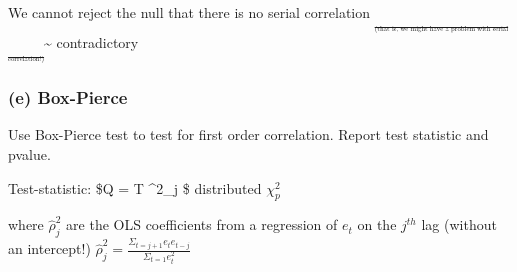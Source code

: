 \documentclass[11pt,]{article}
\begin{document}
We cannot reject the null that there is no serial correlation
\textsubscript{\textsubscript{\textsubscript{\textsubscript{\sout{(that
is, we might have a problem with serial
correlation!)}}}}}\textasciitilde{} contradictory

\subsubsection{(e) Box-Pierce}\label{e-box-pierce}

Use Box-Pierce test to test for first order correlation. Report test
statistic and pvalue.

Test-statistic: \$Q = T \Sigma\hat\rho\^{}2\_j \$ distributed
\(\chi^2_p\)

where \(\hat\rho^2_j\) are the OLS coefficients from a regression of
\(e_t\) on the \(j^{th}\) lag (without an intercept!)
\(\hat\rho^2_j = \frac {\Sigma_{t=j+1} e_t e_{t-j}}{\Sigma_{t=1} e^2_t}\)
\end{document}
